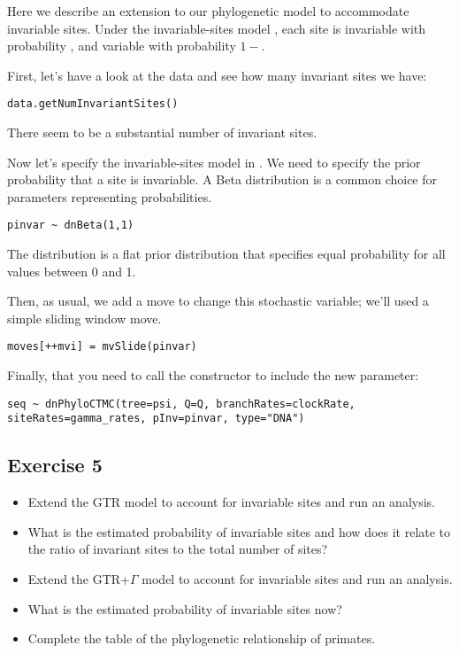 Here we describe an extension to our phylogenetic model to accommodate invariable sites.
Under the invariable-sites model \citep[][]{Hasegawa1985}, each site is invariable with probability , and variable with probability $1-$.

First, let's have a look at the data and see how many invariant sites we have:
{\tt \begin{snugshade*}
\begin{lstlisting}
data.getNumInvariantSites()
\end{lstlisting}
\end{snugshade*}}
There seem to be a substantial number of invariant sites.

Now let's specify the invariable-sites model in \RevBayes.
We need to specify the prior probability that a site is invariable.
A Beta distribution is a common choice for parameters representing probabilities.
{\tt \begin{snugshade*}
\begin{lstlisting}
pinvar ~ dnBeta(1,1)
\end{lstlisting}
\end{snugshade*}}
The  distribution is a flat prior distribution that specifies equal probability for all values between 0 and 1.

Then, as usual, we add a move to change this stochastic variable; we'll used a simple sliding window move.
{\tt \begin{snugshade*}
\begin{lstlisting}
moves[++mvi] = mvSlide(pinvar)
\end{lstlisting}
\end{snugshade*}}

Finally, that you need to call the  constructor to include the new parameter:
{\tt \begin{snugshade*}
\begin{lstlisting}
seq ~ dnPhyloCTMC(tree=psi, Q=Q, branchRates=clockRate, siteRates=gamma_rates, pInv=pinvar, type="DNA")
\end{lstlisting}
\end{snugshade*}}

\subsection{Exercise 5}

\begin{itemize}
\item Extend the GTR model to account for invariable sites and run an analysis.
\item What is the estimated probability of invariable sites and how does it relate to the ratio of invariant sites to the total number of sites?
\item Extend the GTR+$\Gamma$ model to account for invariable sites and run an analysis.
\item What is the estimated probability of invariable sites now?
\item Complete the table of the phylogenetic relationship of primates.
\end{itemize} 




